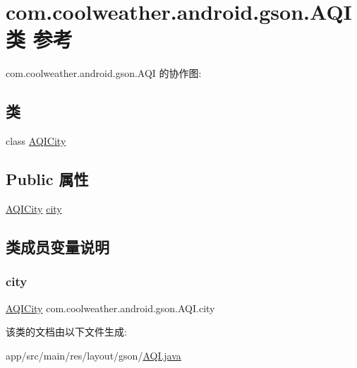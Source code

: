 \hypertarget{classcom_1_1coolweather_1_1android_1_1gson_1_1_a_q_i}{}\section{com.\+coolweather.\+android.\+gson.\+A\+Q\+I类 参考}
\label{classcom_1_1coolweather_1_1android_1_1gson_1_1_a_q_i}


com.\+coolweather.\+android.\+gson.\+A\+QI 的协作图\+:
\subsection*{类}
\begin{DoxyCompactItemize}
\item 
class \mbox{\hyperlink{classcom_1_1coolweather_1_1android_1_1gson_1_1_a_q_i_1_1_a_q_i_city}{A\+Q\+I\+City}}
\end{DoxyCompactItemize}
\subsection*{Public 属性}
\begin{DoxyCompactItemize}
\item 
\mbox{\hyperlink{classcom_1_1coolweather_1_1android_1_1gson_1_1_a_q_i_1_1_a_q_i_city}{A\+Q\+I\+City}} \mbox{\hyperlink{classcom_1_1coolweather_1_1android_1_1gson_1_1_a_q_i_a2d9f72f08b6ef489c087d20a0e59599a}{city}}
\end{DoxyCompactItemize}


\subsection{类成员变量说明}
\mbox{\label{classcom_1_1coolweather_1_1android_1_1gson_1_1_a_q_i_a2d9f72f08b6ef489c087d20a0e59599a}} 
\subsubsection{\texorpdfstring{city}{city}}
{\footnotesize\ttfamily \mbox{\hyperlink{classcom_1_1coolweather_1_1android_1_1gson_1_1_a_q_i_1_1_a_q_i_city}{A\+Q\+I\+City}} com.\+coolweather.\+android.\+gson.\+A\+Q\+I.\+city}



该类的文档由以下文件生成\+:\begin{DoxyCompactItemize}
\item 
app/src/main/res/layout/gson/\mbox{\hyperlink{res_2layout_2gson_2_a_q_i_8java}{A\+Q\+I.\+java}}\end{DoxyCompactItemize}
